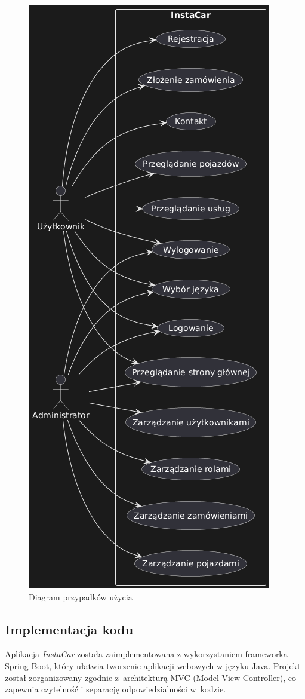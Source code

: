 \documentclass[12pt]{article}
\begin{document}
	\begin{figure}[H]
		\centering
		\includegraphics[height=0.78\textheight]{diagramPrzypadkowUzycia}
		\caption{Diagram przypadków użycia}
		\label{fig:diagramPrzypadkowUzycia}
	\end{figure}
	
\subsection{Implementacja kodu}
Aplikacja \textit{InstaCar} została zaimplementowana z wykorzystaniem frameworka Spring Boot, który ułatwia tworzenie aplikacji webowych w języku Java. Projekt został zorganizowany zgodnie z~architekturą MVC (Model-View-Controller), co zapewnia czytelność i separację odpowiedzialności w~kodzie.
\end{document}
